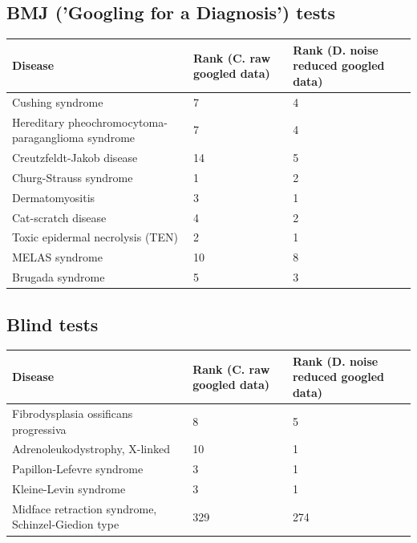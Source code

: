\documentclass[10pt,letterpaper,two column,final]{article}
\begin{document}
\subsection{BMJ ('Googling for a Diagnosis') tests }
\label{app:bmj_raw_reduced}
\begin{center}
\begin{small}
	\begin{tabular}{|p{6cm}|p{2.5cm}|p{2.5cm}|}
	\hline
	\textbf{Disease}  & \textbf{Rank (C. raw googled data)} & \textbf{Rank (D. noise reduced googled data)} \\    \hline\hline
    Cushing syndrome  & 7 &  4\\    \hline
    Hereditary pheochromocytoma-paraganglioma syndrome  & 7 & 4\\    \hline
    Creutzfeldt-Jakob disease  & 14 & 5\\    \hline
    Churg-Strauss syndrome  & 1 & 2\\    \hline
    Dermatomyositis  & 3 & 1\\    \hline
    Cat-scratch disease  & 4 & 2\\    \hline
    Toxic epidermal necrolysis (TEN)  & 2 & 1\\    \hline
    MELAS syndrome  & 10 & 8\\    \hline
    Brugada syndrome  & 5 & 3\\    \hline
	\end{tabular}
\end{small}
\end{center}

\subsection{Blind tests}
\label{app:blind_raw_reduced}
\begin{center}
\begin{small}
	\begin{tabular}{|p{6cm}|p{2.5cm}|p{2.5cm}|}
	\hline
	\textbf{Disease}  & \textbf{Rank (C. raw googled data)} & \textbf{Rank (D. noise reduced googled data)} \\
	\hline\hline
    Fibrodysplasia ossificans progressiva & 8 & 5\\    \hline
    Adrenoleukodystrophy, X-linked & 10 & 1 \\    \hline
    Papillon-Lefevre syndrome & 3 & 1\\    \hline
    Kleine-Levin syndrome  & 3 & 1\\    \hline
    Midface retraction syndrome, Schinzel-Giedion type  & 329 & 274\\    \hline
	\end{tabular}
\end{small}
\end{center}
\end{document}
